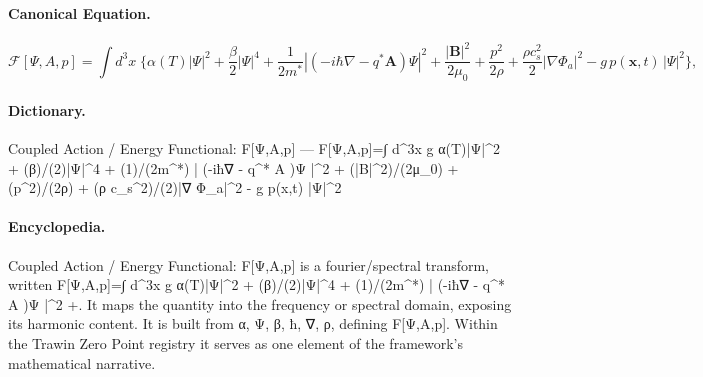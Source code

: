 \paragraph{Canonical Equation.}
\[
\mathcal{F}[\Psi,A,p]=\int d^3x\;\Bigg\{ \alpha(T)|\Psi|^2 + \frac{\beta}{2}|\Psi|^4 + \frac{1}{2m^*}\left|\left(-i\hbar\nabla - q^* \mathbf{A}\right)\Psi\right|^2 + \frac{|\mathbf{B}|^2}{2\mu_0} + \frac{p^2}{2\rho} + \frac{\rho c_s^2}{2}|\nabla \Phi_a|^2 - g\, p(\mathbf{x},t)\,|\Psi|^2 \Bigg\},
\]

\paragraph{Dictionary.}
Coupled Action / Energy Functional: F[Ψ,A,p] — F[Ψ,A,p]=∫ d\textasciicircum{}3x g α(T)|Ψ|\textasciicircum{}2 + (β)/(2)|Ψ|\textasciicircum{}4 + (1)/(2m\textasciicircum{}*) | (-iħ∇ - q\textasciicircum{}* A )Ψ |\textasciicircum{}2 + (|B|\textasciicircum{}2)/(2μ\_0) + (p\textasciicircum{}2)/(2ρ) + (ρ c\_s\textasciicircum{}2)/(2)|∇ Φ\_a|\textasciicircum{}2 - g p(x,t) |Ψ|\textasciicircum{}2

\paragraph{Encyclopedia.}
Coupled Action / Energy Functional: F[Ψ,A,p] is a fourier/spectral transform, written F[Ψ,A,p]=∫ d\textasciicircum{}3x g α(T)|Ψ|\textasciicircum{}2 + (β)/(2)|Ψ|\textasciicircum{}4 + (1)/(2m\textasciicircum{}*) | (-iħ∇ - q\textasciicircum{}* A )Ψ |\textasciicircum{}2 +. It maps the quantity into the frequency or spectral domain, exposing its harmonic content. It is built from α, Ψ, β, ħ, ∇, ρ, defining F[Ψ,A,p]. Within the Trawin Zero Point registry it serves as one element of the framework's mathematical narrative.
